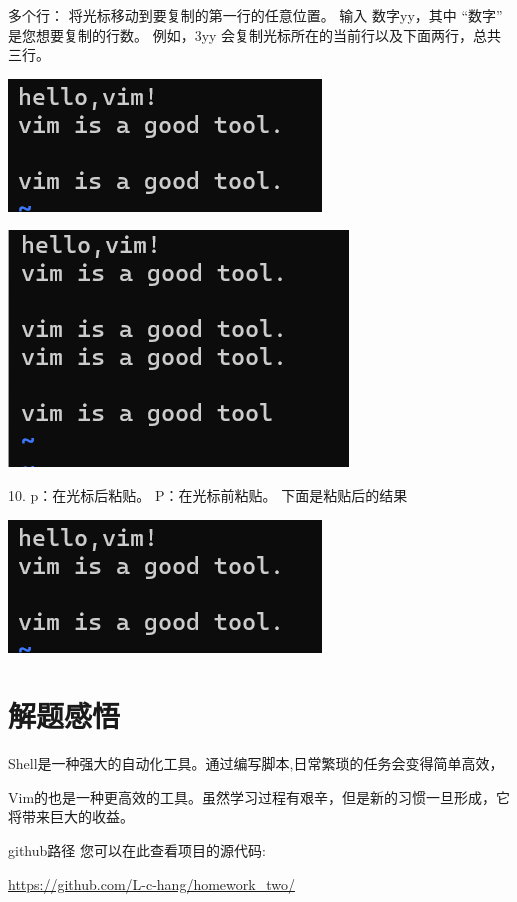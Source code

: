 \documentclass{article}
\begin{document}
多个行：
将光标移动到要复制的第一行的任意位置。
输入 数字yy，其中 “数字” 是您想要复制的行数。
例如，3yy 会复制光标所在的当前行以及下面两行，总共三行。

\noindent
\begin{minipage}{\linewidth}
 \centering
  \includegraphics[width=0.5\linewidth]{vim12.png}
  \label{fig:example}
\end{minipage}

\noindent
\begin{minipage}{\linewidth}
 \centering
  \includegraphics[width=0.5\linewidth]{vim13.png}
  \label{fig:example}
\end{minipage}


10.
p：在光标后粘贴。
P：在光标前粘贴。
下面是粘贴后的结果

\noindent
\begin{minipage}{\linewidth}
 \centering
  \includegraphics[width=0.5\linewidth]{vim12.png}
  \label{fig:example}
\end{minipage}




\section{解题感悟}
Shell是一种强大的自动化工具。通过编写脚本,日常繁琐的任务会变得简单高效，

Vim的也是一种更高效的工具。虽然学习过程有艰辛，但是新的习惯一旦形成，它将带来巨大的收益。

github路径
您可以在此查看项目的源代码: 

\url{https://github.com/L-c-hang/homework_two/}
\end{document}
